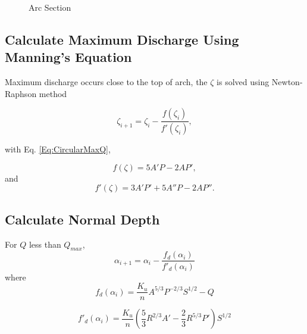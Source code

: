 \begin{figure}[h]
\caption{Arc Section}
\label{Fig:Arc1}
\end{figure}

\subsection{Calculate Maximum Discharge Using Manning's Equation}
Maximum discharge occurs close to the top of arch, the $\zeta$ is solved using Newton-Raphson method

\begin{equation}  
\zeta _{i+1} = \zeta _i - \frac{f(\zeta _i)}{f'(\zeta_i)},
\end{equation}

with Eq. \ref{Eq:CircularMaxQ},

\begin{equation}  
f(\zeta) = 5A'P -  2AP',
\end{equation}
and
\begin{equation}  
f'(\zeta) = 3A'P' + 5A''P - 2AP''.
\end{equation}

\subsection{Calculate Normal Depth}
For $Q$ less than $Q_{max}$,
\begin{equation}  
\alpha_{i+1} = \alpha_i -\frac{f_d(\alpha_{i})}{f'_d(\alpha_{i})}
\end{equation}
where
\begin{equation}  
f_d(\alpha_{i})= \frac{K_u}{n}A^{5/3}P^{-2/3}S^{1/2} - Q 
\end{equation}

\begin{equation}  
f'_d(\alpha_{i})= \frac{K_u}{n}\left(\frac{5}{3}R^{2/3}A' -  \frac{2}{3}R^{5/3}P'\right)S^{1/2}
\end{equation}

